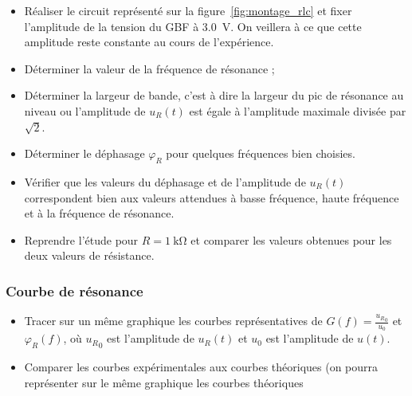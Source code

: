 \documentclass{tp}
\begin{document}
\begin{itemize}
  \item Réaliser le circuit représenté sur la figure~\ref{fig:montage_rlc} et fixer l'amplitude de la tension du GBF à \SI{3.0}{\volt}. On veillera à ce que cette amplitude reste constante au cours de l'expérience.

  \item Déterminer la valeur de la fréquence de résonance ;

  \item Déterminer la largeur de bande, c'est à dire la largeur du pic de résonance au niveau ou l'amplitude de $u_R(t)$ est égale à l'amplitude maximale divisée par $\sqrt{2}$. 

  \item Déterminer le déphasage $\varphi_R$ pour quelques fréquences bien choisies. 

  \item Vérifier que les valeurs du déphasage et de l'amplitude de $u_R(t)$ correspondent bien aux valeurs attendues à basse fréquence, haute fréquence et à la fréquence de résonance.

  \item Reprendre l'étude pour $R=\SI{1}{\kilo\ohm}$ et comparer les valeurs obtenues pour les deux valeurs de résistance.
\end{itemize}

\subsubsection{Courbe de résonance}%
\label{ssub:courbe_de_resonance}
\begin{itemize}
\item Tracer sur un même graphique les courbes représentatives de $G(f) = \frac{{u_R}_0}{u_0}$ et $\varphi_R(f)$, où ${u_R}_0$ est l'amplitude de $u_R(t)$ et $u_0$ est l'amplitude de $u(t)$. 

\item Comparer les courbes expérimentales aux courbes théoriques (on pourra représenter sur le même graphique les courbes théoriques
\end{itemize}
\end{document}
